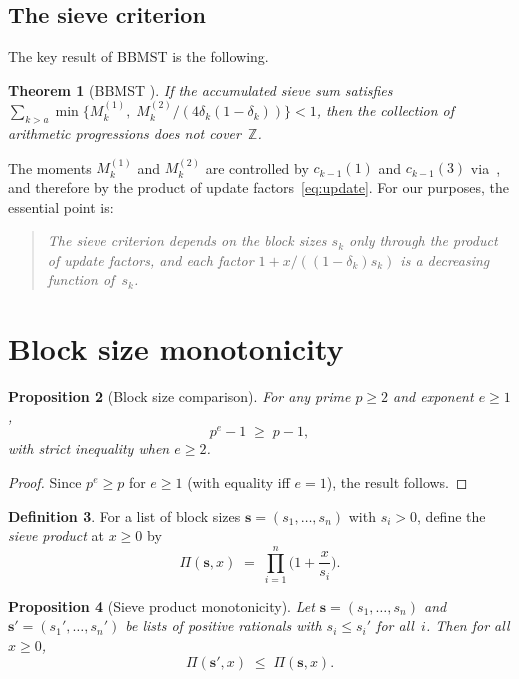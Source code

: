 \documentclass[11pt]{amsart}
\newtheorem{theorem}{Theorem}[section]
\newtheorem{proposition}[theorem]{Proposition}
\theoremstyle{definition}
\newtheorem{definition}[theorem]{Definition}
\theoremstyle{remark}
\begin{document}
\subsection{The sieve criterion}
The key result of BBMST is the following.

\begin{theorem}[{BBMST \cite[Theorem~3.1]{BBMST2019}}]\label{thm:criterion}
If the accumulated sieve sum satisfies
$\sum_{k > a} \min\bigl\{M_k^{(1)},\; M_k^{(2)} / (4\delta_k(1-\delta_k))\bigr\} < 1$,
then the collection of arithmetic progressions does not cover~$\mathbb{Z}$.
\end{theorem}

The moments $M_k^{(1)}$ and $M_k^{(2)}$ are controlled by $c_{k-1}(1)$ and $c_{k-1}(3)$
via~\cite[Theorem~3.2]{BBMST2019}, and therefore by the product of update
factors~\eqref{eq:update}. For our purposes, the essential point is:

\begin{quote}
\emph{The sieve criterion depends on the block sizes $s_k$ only through the
product of update factors, and each factor $1 + x/((1-\delta_k) s_k)$ is a
decreasing function of~$s_k$.}
\end{quote}

\section{Block size monotonicity}

\begin{proposition}[Block size comparison]\label{prop:blockcomp}
For any prime $p \geq 2$ and exponent $e \geq 1$,
\[
  p^e - 1 \;\geq\; p - 1,
\]
with strict inequality when $e \geq 2$.
\end{proposition}

\begin{proof}
Since $p^e \geq p$ for $e \geq 1$ (with equality iff $e = 1$), the result follows.
\end{proof}

\begin{definition}
For a list of block sizes $\mathbf{s} = (s_1, \ldots, s_n)$ with $s_i > 0$, define
the \emph{sieve product} at $x \geq 0$ by
\[
  \Pi(\mathbf{s}, x) \;=\; \prod_{i=1}^{n} \biggl(1 + \frac{x}{s_i}\biggr).
\]
\end{definition}

\begin{proposition}[Sieve product monotonicity]\label{prop:antitone}
Let $\mathbf{s} = (s_1, \ldots, s_n)$ and $\mathbf{s}' = (s_1', \ldots, s_n')$ be
lists of positive rationals with $s_i \leq s_i'$ for all~$i$.
Then for all $x \geq 0$,
\[
  \Pi(\mathbf{s}', x) \;\leq\; \Pi(\mathbf{s}, x).
\]
\end{proposition}
\end{document}
